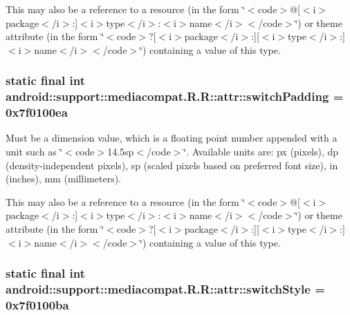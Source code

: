 This may also be a reference to a resource (in the form \char`\"{}$<$code$>$@\mbox{[}$<$i$>$package$<$/i$>$:\mbox{]}$<$i$>$type$<$/i$>$:$<$i$>$name$<$/i$>$$<$/code$>$\char`\"{}) or theme attribute (in the form \char`\"{}$<$code$>$?\mbox{[}$<$i$>$package$<$/i$>$:\mbox{]}\mbox{[}$<$i$>$type$<$/i$>$:\mbox{]}$<$i$>$name$<$/i$>$$<$/code$>$\char`\"{}) containing a value of this type. \hypertarget{classandroid_1_1support_1_1mediacompat_1_1_r_1_1attr_48b558210e844125a219098faef95c01}{
\subsubsection[{switchPadding}]{\setlength{\rightskip}{0pt plus 5cm}static final int android::support::mediacompat.R.R::attr::switchPadding = 0x7f0100ea}}
\label{classandroid_1_1support_1_1mediacompat_1_1_r_1_1attr_48b558210e844125a219098faef95c01}


Must be a dimension value, which is a floating point number appended with a unit such as \char`\"{}$<$code$>$14.5sp$<$/code$>$\char`\"{}. Available units are: px (pixels), dp (density-independent pixels), sp (scaled pixels based on preferred font size), in (inches), mm (millimeters). 

This may also be a reference to a resource (in the form \char`\"{}$<$code$>$@\mbox{[}$<$i$>$package$<$/i$>$:\mbox{]}$<$i$>$type$<$/i$>$:$<$i$>$name$<$/i$>$$<$/code$>$\char`\"{}) or theme attribute (in the form \char`\"{}$<$code$>$?\mbox{[}$<$i$>$package$<$/i$>$:\mbox{]}\mbox{[}$<$i$>$type$<$/i$>$:\mbox{]}$<$i$>$name$<$/i$>$$<$/code$>$\char`\"{}) containing a value of this type. \hypertarget{classandroid_1_1support_1_1mediacompat_1_1_r_1_1attr_0b20f84739d608ec1ef36cff04bcd508}{
\subsubsection[{switchStyle}]{\setlength{\rightskip}{0pt plus 5cm}static final int android::support::mediacompat.R.R::attr::switchStyle = 0x7f0100ba}}
\label{classandroid_1_1support_1_1mediacompat_1_1_r_1_1attr_0b20f84739d608ec1ef36cff04bcd508}


